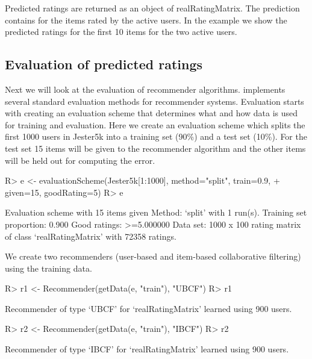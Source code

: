 \documentclass[nojss]{jss}
\newcommand{\class}[1]{\mbox{\textsf{#1}}}
\begin{document}
Predicted ratings are returned as an object of \class{realRatingMatrix}.
The prediction contains  for the items rated by the active users.
In the example we show the predicted ratings for the first 10 items for
the two active users.

\subsection{Evaluation of predicted ratings}
Next we will look at the evaluation of recommender algorithms.
 implements several
standard evaluation methods for recommender systems.
Evaluation starts with creating an evaluation scheme
that determines what and how data is used for training and evaluation.
Here we create an evaluation scheme which splits the first 1000 users
in Jester5k into a training set (90\%) and a test set (10\%). For
the test set 15 items will be given to the recommender algorithm
and the other items will be held out
for computing the error.

\begin{Schunk}
\begin{Sinput}
R> e <- evaluationScheme(Jester5k[1:1000], method="split", train=0.9,
+     given=15, goodRating=5)
R> e
\end{Sinput}
\begin{Soutput}
Evaluation scheme with 15 items given
Method: ‘split’ with 1 run(s).
Training set proportion: 0.900
Good ratings: >=5.000000
Data set: 1000 x 100 rating matrix of class ‘realRatingMatrix’ with 72358 ratings.
\end{Soutput}
\end{Schunk}

We create two recommenders (user-based and item-based collaborative filtering)
using the training data.

\begin{Schunk}
\begin{Sinput}
R> r1 <- Recommender(getData(e, "train"), "UBCF")
R> r1
\end{Sinput}
\begin{Soutput}
Recommender of type ‘UBCF’ for ‘realRatingMatrix’
learned using 900 users.
\end{Soutput}
\begin{Sinput}
R> r2 <- Recommender(getData(e, "train"), "IBCF")
R> r2
\end{Sinput}
\begin{Soutput}
Recommender of type ‘IBCF’ for ‘realRatingMatrix’
learned using 900 users.
\end{Soutput}
\end{Schunk}
\end{document}
